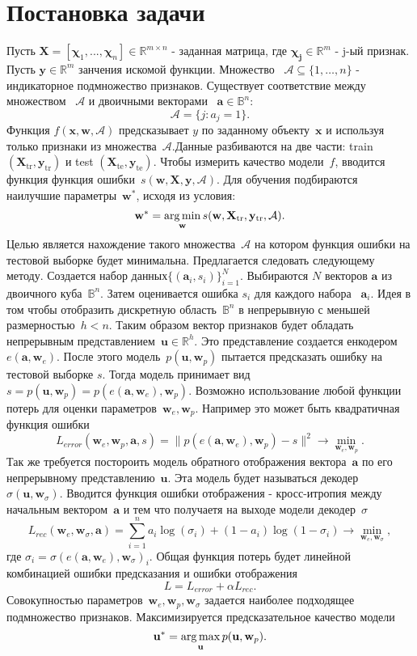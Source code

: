 \documentclass[12pt,twoside]{article}
\newcommand{\bX}{\mathbf{X}}
\newcommand{\ba}{\mathbf{a}}
\newcommand{\bx}{\mathbf{x}}
\newcommand{\by}{\mathbf{y}}
\newcommand{\bu}{\mathbf{u}}
\newcommand{\bw}{\mathbf{w}}
\newcommand{\cA}{\mathcal{A}}
\newcommand{\bbB}{\mathbb{B}}
\newcommand{\bbR}{\mathbb{R}}
\begin{document}
\section{Постановка задачи}
Пусть $\mathbf{X}=[\boldsymbol{\chi}_1,...,\boldsymbol{\chi}_n]\in\mathbb{R}^{m\times n}$ - заданная матрица, где $\boldsymbol{\chi_j}\in\mathbb{R}^m$ - j-ый признак. Пусть  $\by \in \bbR^m$ занчения искомой функции. Множество ~$\cA \subseteq \{1, \dots, n\}$ - индикаторное подмножество признаков. Существует соответствие между множеством ~$\cA$ и двоичными векторами ~$\ba \in \bbB^n$:
\[
	\cA = \{j: a_j = 1\}.
\]
Функция  $f(\bx, \bw, \cA)$ предсказывает $y$ по заданному объекту~$\bx$ и используя только признаки из множества~$\cA$.Данные разбиваются на две части: train $(\bX_{\text{tr}}, \by_{\text{tr}})$ и test $(\bX_{\text{te}}, \by_{\text{te}})$. Чтобы измерить качество модели~$f$, вводится функция функция ошибки~$s(\bw, \bX, \by, \cA)$. Для обучения подбираются наилучшие параметры~$\bw^*$, исходя из условия:
\[
	\bw^* = \argmin_{\bw} s(\bw, \bX_{\text{tr}}, \by_{\text{tr}}, \cA).
\]
 Целью является нахождение такого множества~$\cA$ на котором функция ошибки на тестовой выборке будет минимальна. Предлагается следовать следующему методу. Создается набор данных$\{(\ba_i, s_i)\}_{i=1}^N$. Выбираются $N$ векторов $\ba$ из двоичного куба~$\bbB^n$. Затем оценивается ошибка $s_i$ для каждого набора ~$\ba_i$. Идея в том чтобы отобразить дискретную область~$\bbB^n$ в непрерывную с меньшей размерностью~$h <n$. Таким образом вектор признаков будет обладать непрерывным представлением~$\bu \in \bbR^h$. Это представление создается енкодером~$e(\ba, \bw_e)$. После этого модель~$p(\bu, \bw_p)$ пытается предсказать ошибку на тестовой выборке $s$. Тогда модель принимает вид~$s=p(\bu, \bw_p) = p(e(\ba, \bw_e), \bw_p)$. Возможно использование любой функции потерь для оценки параметров~$\bw_e, \bw_p$. Например это может быть квадратичная функция ошибки
 \[
	L_{error}(\bw_e, \bw_p, \ba, s) = \| p(e(\ba, \bw_e), \bw_p) - s \| ^2 \rightarrow \min_{\bw_e, \bw_p}.
\]
Так же требуется постороить модель обратного отображения вектора~$\ba$ по его непрерывному представлению~$\bu$. Эта модель будет называться декодер~$\sigma(\bu, \bw_{\sigma})$. Вводится функция ошибки отображения - кросс-итропия между начальным вектором~$\ba$ и тем что получаетя на выходе модели декодер~$\sigma$
\[
	L_{rec}(\bw_e, \bw_\sigma, \ba) = \sum_{i=1}^n a_i \log(\sigma_i) + (1 - a_i) \log (1 - \sigma_i) \rightarrow \min_{\bw_e, \bw_\sigma},
\]
где $\sigma_i = \sigma(e(\ba, \bw_e), \bw_{\sigma})_i$.
Общая функция потерь будет линейной комбинацией ошибки предсказания и ошибки отображения
\[
	L = L_{error} + \alpha L_{rec}.
\]
Совокупностью параметров~$\bw_e, \bw_p, \bw_\sigma$ задается наиболее подходящее подмножество признаков. Максимизируется предсказательное качество модели
\[
	\bu^* = \argmax_{\bu} p(\bu, \bw_p).
\]
\end{document}
